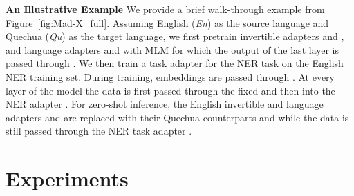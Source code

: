 \documentclass[11pt,a4paper]{article}
\begin{document}
\vspace{1.8mm}
\noindent \textbf{An Illustrative Example}\hspace{1.3mm}
We  provide a brief walk-through example from Figure~\ref{fig:Mad-X_full}. Assuming English (\textit{En}) as the source language and Quechua (\textit{Qu}) as the target language, we first pretrain invertible adapters  and , and language adapters  and  with MLM for which the output of the last  layer is passed through . We then train a task adapter for the NER task  on the English NER training set. During training, embeddings are passed through . At every layer of the model the data is first passed through the fixed  and then into the NER adapter .  
For zero-shot inference, the English invertible and language adapters  and  are  replaced with their Quechua counterparts  and  while the data is still passed through the NER task adapter . 


\section{Experiments}
\end{document}
